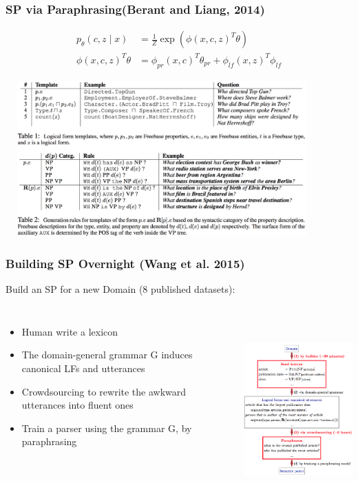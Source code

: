 \documentclass{beamer}
\begin{document}
\begin{frame}
    \frametitle{SP via Paraphrasing(Berant and Liang, 2014)}
    \begin{align*}
        p_\theta(c, z\mid x) &= \frac{1}{Z}\exp(\phi(x,c,z)^T\theta) \\
        \phi(x,c,z)^T\theta &= \phi_{pr}(x,c)^T\theta_{pr} + \phi_{lf}(x,z)^T\phi_{lf}
    \end{align*}

    \begin{center}
        \includegraphics[width=12cm,height=6cm]{img/paraphrase-template.png}
    \end{center}
\end{frame}

\begin{frame}
    \frametitle{Building SP Overnight (Wang et al. 2015)}

    Build an SP for a new Domain (8 published datasets):
    \begin{columns}
        \begin{itemize}
            \item Human write a lexicon
            \item The domain-general grammar G induces canonical LFs and utterances
            \item Crowdsourcing to rewrite the awkward utterances into fluent ones
            \item Train a parser using the grammar G, by paraphrasing
        \end{itemize}
        \includegraphics[width=6cm,height=7.2cm]{img/sp-overnight.png}
    \end{columns}
\end{frame}
\end{document}
